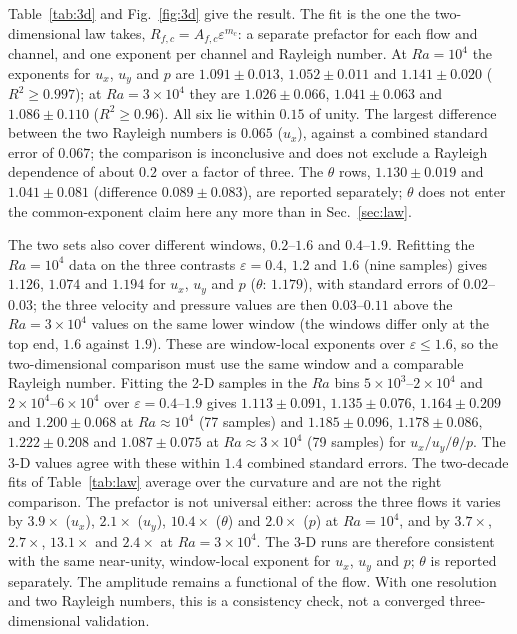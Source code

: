 \documentclass[preprint,11pt,a4paper,times,doubleblind]{elsarticle}
\begin{document}
Table~\ref{tab:3d} and Fig.~\ref{fig:3d} give the result. The fit is the one the two-dimensional
law takes, $R_{f,c}=A_{f,c}\varepsilon^{m_c}$: a separate prefactor for each flow and channel, and
one exponent per channel and Rayleigh number. At $Ra=10^4$ the exponents for $u_x$, $u_y$ and $p$
are $1.091\pm0.013$, $1.052\pm0.011$ and $1.141\pm0.020$ ($R^2\ge0.997$); at $Ra=3\times10^4$ they
are $1.026\pm0.066$, $1.041\pm0.063$ and $1.086\pm0.110$ ($R^2\ge0.96$). All six lie within $0.15$
of unity. The largest difference between the two Rayleigh numbers is $0.065$ ($u_x$), against a
combined standard error of $0.067$; the comparison is inconclusive and does not exclude a Rayleigh
dependence of about $0.2$ over a factor of three. The $\theta$ rows, $1.130\pm0.019$ and
$1.041\pm0.081$ (difference $0.089\pm0.083$), are reported separately; $\theta$ does not enter the
common-exponent claim here any more than in Sec.~\ref{sec:law}.

The two sets also cover different windows, $0.2$--$1.6$ and $0.4$--$1.9$. Refitting the
$Ra=10^4$ data on the three contrasts $\varepsilon=0.4$, $1.2$ and $1.6$ (nine samples) gives
$1.126$, $1.074$ and $1.194$ for $u_x$, $u_y$ and $p$ ($\theta$: $1.179$), with standard errors of
$0.02$--$0.03$; the three velocity and pressure values are then $0.03$--$0.11$ above the
$Ra=3\times10^4$ values on the same lower window (the windows differ only at the top end, $1.6$
against $1.9$). These are window-local exponents over $\varepsilon\le1.6$, so the two-dimensional
comparison must use the same window and a comparable Rayleigh number. Fitting the 2-D samples in the $Ra$ bins
$5\times10^3$--$2\times10^4$ and $2\times10^4$--$6\times10^4$ over $\varepsilon=0.4$--$1.9$ gives $1.113\pm0.091$,
$1.135\pm0.076$, $1.164\pm0.209$ and $1.200\pm0.068$ at $Ra\approx10^4$ (77 samples) and
$1.185\pm0.096$, $1.178\pm0.086$, $1.222\pm0.208$ and $1.087\pm0.075$ at $Ra\approx3\times10^4$
(79 samples) for $u_x/u_y/\theta/p$. The 3-D values agree with these within $1.4$ combined standard errors. The two-decade fits of
Table~\ref{tab:law} average over the curvature and are not the right comparison. The prefactor is
not universal either: across the three flows it varies by $3.9\times$ ($u_x$), $2.1\times$ ($u_y$),
$10.4\times$ ($\theta$) and $2.0\times$ ($p$) at $Ra=10^4$, and by $3.7\times$, $2.7\times$,
$13.1\times$ and $2.4\times$ at $Ra=3\times10^4$. The 3-D runs are therefore consistent with the same near-unity, window-local exponent for $u_x$,
$u_y$ and $p$; $\theta$ is reported separately. The amplitude remains a functional of the flow.
With one resolution and two Rayleigh numbers, this is a consistency check, not a converged
three-dimensional validation.
\end{document}
